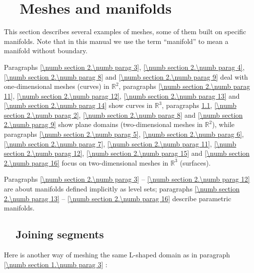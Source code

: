 
\chapter{~~Meshes and manifolds}\label{\numb section 2}

This section describes several examples of meshes, some of them built on specific manifolds.
Note that in this manual we use the term ``manifold'' to mean a manifold without boundary.

Paragraphs \ref{\numb section 2.\numb parag 3}, \ref{\numb section 2.\numb parag 4},
\ref{\numb section 2.\numb parag 8} and \ref{\numb section 2.\numb parag 9} deal
with one-dimensional meshes (curves) in $ \mathbb{R}^2 $,
paragraphs \ref{\numb section 2.\numb parag 11}, \ref{\numb section 2.\numb parag 12},
\ref{\numb section 2.\numb parag 13} and \ref{\numb section 2.\numb parag 14} show
curves in $ \mathbb{R}^3 $,
paragraphs \ref{\numb section 2.\numb parag 1}, \ref{\numb section 2.\numb parag 2},
\ref{\numb section 2.\numb parag 8} and \ref{\numb section 2.\numb parag 9} show
plane domains (two-dimensional meshes in $ \mathbb{R}^2 $),
while paragraphs \ref{\numb section 2.\numb parag 5}, \ref{\numb section 2.\numb parag 6},
\ref{\numb section 2.\numb parag 7}, \ref{\numb section 2.\numb parag 11},
\ref{\numb section 2.\numb parag 12}, \ref{\numb section 2.\numb parag 15} and
\ref{\numb section 2.\numb parag 16} focus on two-dimensional meshes
in $ \mathbb{R}^3 $ (surfaces).

Paragraphs \ref{\numb section 2.\numb parag 3} -- \ref{\numb section 2.\numb parag 12}
are about manifolds defined implicitly as level sets;
paragraphs \ref{\numb section 2.\numb parag 13} -- \ref{\numb section 2.\numb parag 16}
describe parametric manifolds.


\section{~~Joining segments}\label{\numb section 2.\numb parag 1}

Here is another way of meshing the same L-shaped domain as in paragraph
\ref{\numb section 1.\numb parag 3} :

